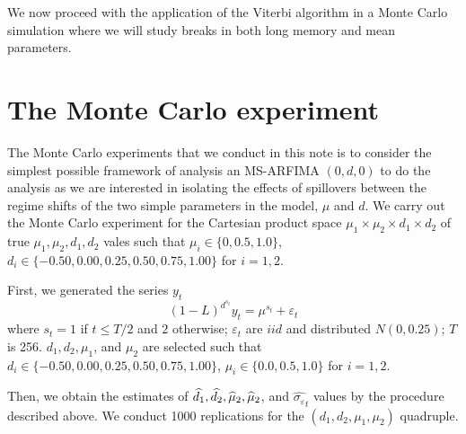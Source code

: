 \documentclass[11pt,fleqn]{article}
\begin{document}
{We now proceed with the application of the Viterbi algorithm in a Monte
Carlo simulation where we will study breaks in both long memory and mean
parameters.


\section{The Monte Carlo experiment}

The Monte Carlo experiments that we conduct in this note is to consider the
simplest possible framework of analysis an MS-ARFIMA $(0,d,0)$ to do the
analysis as we are interested in isolating the effects of spillovers between
the  regime shifts of the two simple parameters in the model, $\mu $ and $%
d.$ We carry out the Monte Carlo experiment for the Cartesian product space $%
\mu _{1}\times \mu _{2}\times d_{1}\times d_{2}$ of true $\mu _{1},\mu
_{2},d_{1},d_{2}$ vales such that $\mu _{i}\in \{0,0.5,1.0\}$, $d_{i}\in
\{-0.50,0.00,0.25,0.50,0.75,1.00\}$ for $i=1,2$.

First, we generated the series $y_{t}$ 
\begin{equation*}
\left( 1-L\right) ^{d^{s_{t}}}y_{t}=\mu ^{s_{t}}+\varepsilon _{t}
\end{equation*}%
where $s_{t}=1$ if $t\leq T/2$ and $2$ otherwise; $\varepsilon _{t}$ are $%
iid $ and distributed $N(0,0.25)$; $T$ is 256. $d_{1},d_{2},\mu _{1}$, and $%
\mu _{2}$ are selected such that $d_{i}\in
\{-0.50,0.00,0.25,0.50,0.75,1.00\} $, $\mu _{i}\in \{0.0,0.5,1.0\}$ for $%
i=1,2$.

Then, we obtain the estimates of $\widehat{d_{1}},\widehat{d_{2}},\widehat{%
\mu }_{2},\widehat{\mu }_{2}$, and $\widehat{\sigma _{\varepsilon }}_{t}$
values by the procedure described above. We conduct 1000 replications for
the $(d_{1},d_{2},\mu _{1},\mu _{2})$ quadruple. 

}
\end{document}
